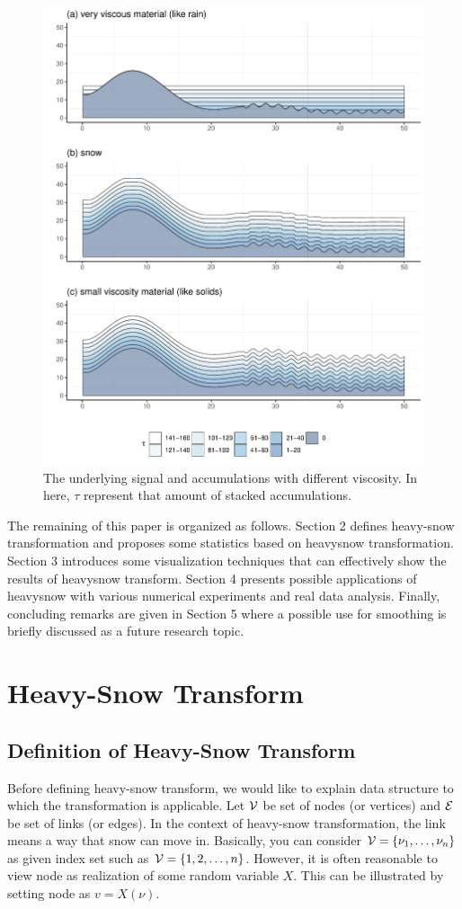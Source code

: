\documentclass[preprint, review, 12pt]{article}
\theoremstyle{definition}
\theoremstyle{remark}
\begin{document}
\begin{figure}
\centering
\includegraphics[width=1\textwidth]{Fig/Fig2.pdf}
\caption{The underlying signal and accumulations with different viscosity. In here, $\tau$ represent that amount of stacked accumulations.}
\end{figure}

The remaining of this paper is organized as follows. Section 2 defines heavy-snow transformation and proposes some statistics based on heavysnow transformation. 
Section 3 introduces some visualization techniques that can effectively show the results of heavysnow transform. Section 4 presents possible applications of heavysnow with various numerical experiments and real data analysis. Finally, concluding remarks are given in Section 5 where a possible use for smoothing is briefly discussed as a future research topic. 

\section{Heavy-Snow Transform}
\subsection{Definition of Heavy-Snow Transform}
Before defining heavy-snow transform, we would like to explain data structure to which the transformation is applicable. 
Let ${\cal V}$ be set of nodes (or vertices) and ${\cal E}$ be set of links (or edges). In the context of heavy-snow transformation, the link means a way that snow can move in. Basically, you can consider ${\cal V}=\{\nu_1,\dots,\nu_n\}$ as given index set such as ${\cal V}=\{1,2,\dots,n\}$. However, it is often reasonable to view node as realization of some random variable $X$. This can be illustrated by setting node as $v=X(\nu)$. 
\end{document}
